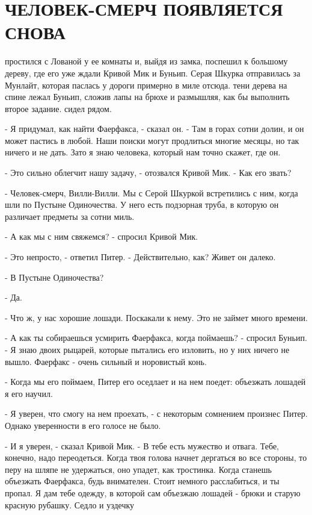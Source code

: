 \chapter{ЧЕЛОВЕК-СМЕРЧ ПОЯВЛЯЕТСЯ СНОВА}
\par{} простился с Лованой у ее комнаты и, выйдя из замка, поспешил 
к большому дереву, где его уже ждали Кривой Мик и Буньип. Серая Шкурка 
отправилась за Мунлайт, которая паслась у дороги примерно в миле 
отсюда.
 тени дерева на спине лежал Буньип, сложив лапы на брюхе и 
размышляя, как бы выполнить второе задание.
 сидел рядом.
\par- Я придумал, как найти Фаерфакса, - сказал он. - Там в горах 
сотни долин, и он может пастись в любой. Наши поиски могут продлиться 
многие месяцы, но так ничего и не дать. Зато я знаю человека, который 
нам точно скажет, где он.
\par- Это сильно облегчит нашу задачу, - отозвался Кривой Мик. - Как 
его звать?
\par- Человек-смерч, Вилли-Вилли. Мы с Серой Шкуркой встретились с 
ним, когда шли по Пустыне Одиночества. У него есть подзорная труба, в 
которую он различает предметы за сотни миль.
\par- А как мы с ним свяжемся? - спросил Кривой Мик.
\par- Это непросто, - ответил Питер. - Действительно, как? Живет он 
далеко.
\par- В Пустыне Одиночества?
\par- Да.
\par- Что ж, у нас хорошие лошади. Поскакали к нему. Это не займет 
много времени.
\par- А как ты собираешься усмирить Фаерфакса, когда поймаешь? - 
спросил Буньип. - Я знаю двоих рыцарей, которые пытались его изловить, 
но у них ничего не вышло. Фаерфакс - очень сильный и норовистый конь.
\par- Когда мы его поймаем, Питер его оседлает и на нем поедет: 
объезжать лошадей я его научил.
\par- Я уверен, что смогу на нем проехать, - с некоторым сомнением 
произнес Питер. Однако уверенности в его голосе не было.
\par- И я уверен, - сказал Кривой Мик. - В тебе есть мужество и 
отвага. Тебе, конечно, надо переодеться. Когда твоя голова начнет 
дергаться во все стороны, то перу на шляпе не удержаться, оно упадет, 
как тростинка. Когда станешь объезжать Фаерфакса, будь внимателен. 
Стоит немного расслабиться, и ты пропал. Я дам тебе одежду, в которой 
сам объезжаю лошадей - брюки и старую красную рубашку. Седло и уздечку 
